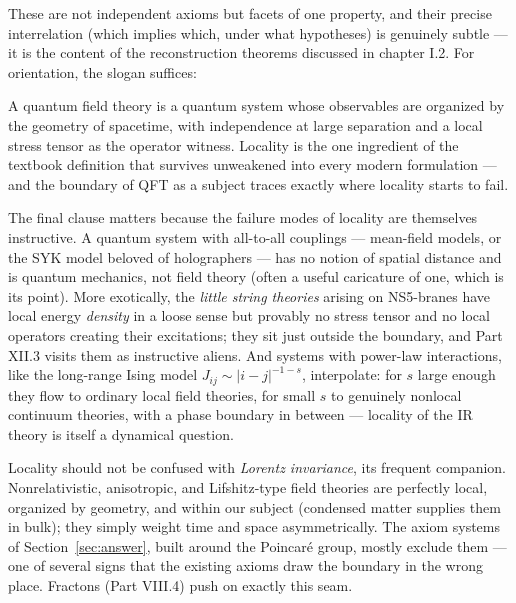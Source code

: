 \noin These are not independent axioms but facets of one property, and their
precise interrelation (which implies which, under what hypotheses) is
genuinely subtle --- it is the content of the reconstruction theorems
discussed in chapter I.2. For orientation, the slogan suffices:

\begin{iidea}
\label{idea:locality}
A quantum field theory is a quantum system whose observables are organized by
the geometry of spacetime, with independence at large separation and a local
stress tensor as the operator witness. Locality is the one ingredient of the
textbook definition that survives unweakened into every modern formulation ---
and the boundary of QFT as a subject traces exactly where locality starts to
fail.
\end{iidea}

The final clause matters because the failure modes of locality are themselves
instructive. A
quantum system with all-to-all couplings --- mean-field models, or the SYK model
beloved of holographers --- has no notion of spatial distance and is quantum
mechanics, not field theory (often a useful caricature of one, which is its
point). More exotically, the \emph{little string theories} arising on NS5-branes
have local energy \emph{density} in a loose sense but provably no stress tensor
and no local operators creating their excitations; they sit just outside the
boundary, and Part XII.3 visits them as instructive aliens. And systems with
power-law interactions, like the long-range Ising model $J_{ij} \sim
|i-j|^{-1-s}$, interpolate: for $s$ large enough they flow to ordinary local
field theories, for small $s$ to genuinely nonlocal continuum theories, with a
phase boundary in between --- locality of the IR theory is itself a dynamical
question.

\begin{nnote}
Locality should not be confused with \emph{Lorentz invariance}, its frequent
companion. Nonrelativistic, anisotropic, and Lifshitz-type field theories are
perfectly local, organized by geometry, and within our subject (condensed matter
supplies them in bulk); they simply weight time and space asymmetrically. The
axiom systems of Section~\ref{sec:answer}, built around the Poincar\'e group,
mostly exclude them --- one of several signs that the existing axioms draw the
boundary in the wrong place. Fractons (Part VIII.4) push on exactly this seam.
\end{nnote}

